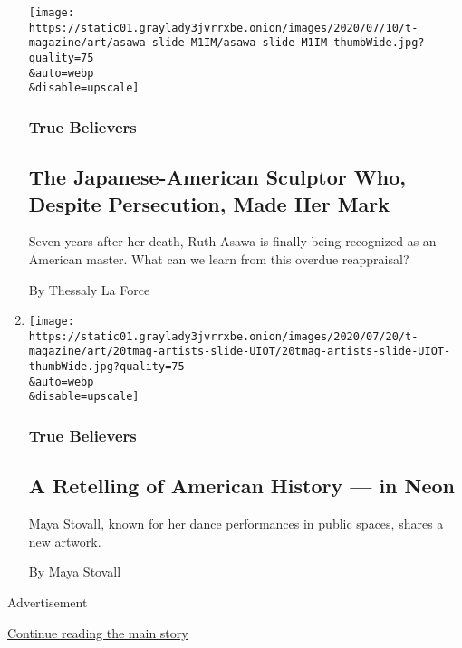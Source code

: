 \begin{enumerate}
  \texttt{[image: https://static01.graylady3jvrrxbe.onion/images/2020/07/10/t-magazine/art/asawa-slide-M1IM/asawa-slide-M1IM-thumbWide.jpg?quality=75\\\&auto=webp\\\&disable=upscale]}

  \hypertarget{true-believers-15}{%
  \subsubsection{True Believers}\label{true-believers-15}}

  \hypertarget{the-japanese-american-sculptor-who-despite-persecution-made-her-mark-1}{%
  \subsection{The Japanese-American Sculptor Who, Despite Persecution,
  Made Her
  Mark}\label{the-japanese-american-sculptor-who-despite-persecution-made-her-mark-1}}

  Seven years after her death, Ruth Asawa is finally being recognized as
  an American master. What can we learn from this overdue reappraisal?

  By Thessaly La Force
\item
  \href{/2020/07/20/t-magazine/maya-stovall.html}{}

  \texttt{[image: https://static01.graylady3jvrrxbe.onion/images/2020/07/20/t-magazine/art/20tmag-artists-slide-UIOT/20tmag-artists-slide-UIOT-thumbWide.jpg?quality=75\\\&auto=webp\\\&disable=upscale]}

  \hypertarget{true-believers-16}{%
  \subsubsection{True Believers}\label{true-believers-16}}

  \hypertarget{a-retelling-of-american-history--in-neon-1}{%
  \subsection{A Retelling of American History --- in
  Neon}\label{a-retelling-of-american-history--in-neon-1}}

  Maya Stovall, known for her dance performances in public spaces,
  shares a new artwork.

  By Maya Stovall
\end{enumerate}

Advertisement

\protect\hyperlink{after-mid2}{Continue reading the main story}

